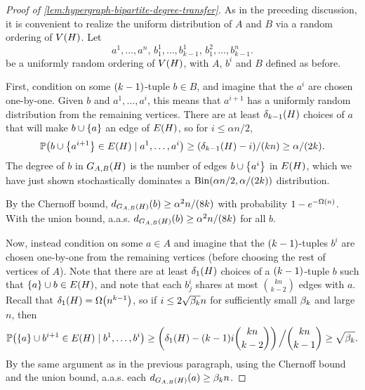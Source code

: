 \documentclass[11pt,english]{article}
\theoremstyle{plain}
\theoremstyle{definition}
\theoremstyle{definition}
\theoremstyle{plain}
\theoremstyle{plain}
\theoremstyle{plain}
\theoremstyle{plain}
\theoremstyle{remark}
\theoremstyle{remark}
\let\originalleft\left
\let\originalright\right
\renewcommand{\left}{\mathopen{}\mathclose\bgroup\originalleft}
\renewcommand{\right}{\aftergroup\egroup\originalright}
\begin{document}
\begin{proof}
[Proof of \ref{lem:hypergraph-bipartite-degree-transfer}]As in the preceding discussion, it is convenient to realize the uniform
distribution of $A$ and $B$ via a random ordering of $V\left(H\right)$.
Let 
\[
a^{1},\dots,a^{n},\, b_{1}^{1},\dots,b_{k-1}^{1},\, b_{1}^{2},\dots,b_{k-1}^{n}.
\]
be a uniformly random ordering of $V\left(H\right)$, with $A$, $b^i$ and
$B$ defined as before.

First, condition on some $\left(k-1\right)$-tuple $b\in B$, and imagine that the $a^i$ are chosen one-by-one. Given $b$ and $a^{1},\dots,a^{i}$, this means that $a^{i+1}$ has a uniformly random distribution from the remaining vertices. There are at least $\delta_{k-1}\left(H\right)$ choices of $a$ that will make $b\cup\left\{a\right\}$ an edge of $E\left(H\right)$, so for $i\le\alpha n/2$,
\[
\Pr\left(b\cup\left\{ a^{i+1}\right\} \in E\left(H\right)\mid a^{1},\dots,a^{i}\right)\ge\left(\delta_{k-1}\left(H\right)-i\right)/\left(kn\right)\ge\alpha/\left(2k\right).
\]
The degree of $b$ in $G_{A,B}\left(H\right)$ is the number of edges $b\cup\left\{ a^{i}\right\}$ in $E\left(H\right)$, which we have just shown stochastically dominates a $\Bin(\alpha n/2,\alpha/\left(2k\right))$ distribution.
\begin{comment}This means we can couple our random ordering with a sequence of independent random variables $X_1,\dots,X_{\alpha n/2}$ each having a Bernoulli distribution with parameter $\alpha/\left(2k\right)$, in such a way that $d_{G_{A,B}\left(H\right)}\left(b\right)\ge\sum_{i=1}^{\alpha n/2}X_i$. \end{comment}
By the Chernoff bound, $d_{G_{A,B}\left(H\right)}\left(b\right)\ge\alpha^{2}n/\left(8k\right)$
with probability $1-e^{-\Omega\left(n\right)}$. With the union bound, a.a.s.{} $d_{G_{A,B}\left(H\right)}\left(b\right)\ge\alpha^{2}n/\left(8k\right)$ for all $b$.

Now, instead condition on some $a\in A$ and imagine that the $\left(k-1\right)$-tuples $b^i$ are chosen one-by-one from the remaining vertices
(before choosing the rest of vertices of $A$). Note that there are at least $\delta_{1}\left(H\right)$ choices of a $\left(k-1\right)$-tuple $b$ such that $\left\{a\right\}\cup b\in E\left(H\right)$, and note that each $b_{j}^{i}$
shares at most ${kn \choose k-2}$ edges with $a$. Recall that $\delta_1\left(H\right)=\Omega\left(n^{k-1}\right)$, so  if $i\le2\sqrt{\beta_k}n$ for sufficiently small $\beta_k$ and large $n$,
then
\[
\Pr\left(\left\{ a\right\} \cup b^{i+1}\in E\left(H\right)\mid b^{1},\dots,b^{i}\right)\ge\left(\delta_{1}\left(H\right)-\left(k-1\right)i{kn \choose k-2}\right)\left.\vphantom{\sum}\right/{kn \choose k-1}\ge\sqrt{\amat}.
\]
By the same argument as in the previous paragraph, using the Chernoff bound and the union bound, a.a.s.{} each $d_{G_{A,B}\left(H\right)}\left(a\right)\ge\amat n$.
\end{proof}
\end{document}
